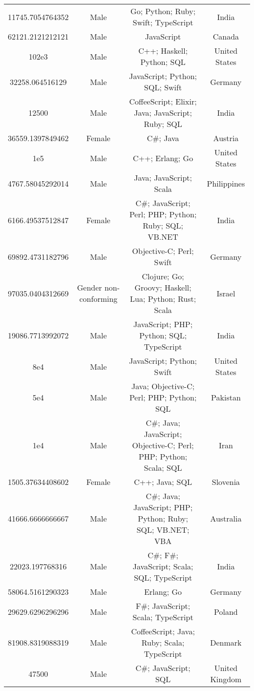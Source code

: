 \begin{center}
\begin{tabular}{ |c|c|c|c| }
11745.7054764352  &  Male  &  Go; Python; Ruby; Swift; TypeScript  &  India  \\ 
62121.2121212121  &  Male  &  JavaScript  &  Canada  \\ 
102e3  &  Male  &  C++; Haskell; Python; SQL  &  United States  \\ 
32258.064516129  &  Male  &  JavaScript; Python; SQL; Swift  &  Germany  \\ 
12500  &  Male  &  CoffeeScript; Elixir; Java; JavaScript; Ruby; SQL  &  India  \\ 
36559.1397849462  &  Female  &  C\#; Java  &  Austria  \\ 
1e5  &  Male  &  C++; Erlang; Go  &  United States  \\ 
4767.58045292014  &  Male  &  Java; JavaScript; Scala  &  Philippines  \\ 
6166.49537512847  &  Female  &  C\#; JavaScript; Perl; PHP; Python; Ruby; SQL; VB.NET  &  India  \\ 
69892.4731182796  &  Male  &  Objective-C; Perl; Swift  &  Germany  \\ 
97035.0404312669  &  Gender non-conforming  &  Clojure; Go; Groovy; Haskell; Lua; Python; Rust; Scala  &  Israel  \\ 
19086.7713992072  &  Male  &  JavaScript; PHP; Python; SQL; TypeScript  &  India  \\ 
8e4  &  Male  &  JavaScript; Python; Swift  &  United States  \\ 
5e4  &  Male  &  Java; Objective-C; Perl; PHP; Python; SQL  &  Pakistan  \\ 
1e4  &  Male  &  C\#; Java; JavaScript; Objective-C; Perl; PHP; Python; Scala; SQL  &  Iran  \\ 
1505.37634408602  &  Female  &  C++; Java; SQL  &  Slovenia  \\ 
41666.6666666667  &  Male  &  C\#; Java; JavaScript; PHP; Python; Ruby; SQL; VB.NET; VBA  &  Australia  \\ 
22023.197768316  &  Male  &  C\#; F\#; JavaScript; Scala; SQL; TypeScript  &  India  \\ 
58064.5161290323  &  Male  &  Erlang; Go  &  Germany  \\ 
29629.6296296296  &  Male  &  F\#; JavaScript; Scala; TypeScript  &  Poland  \\ 
81908.8319088319  &  Male  &  CoffeeScript; Java; Ruby; Scala; TypeScript  &  Denmark  \\ 
47500  &  Male  &  C\#; JavaScript; SQL  &  United Kingdom  \\ 

\end{tabular}
\end{center}
